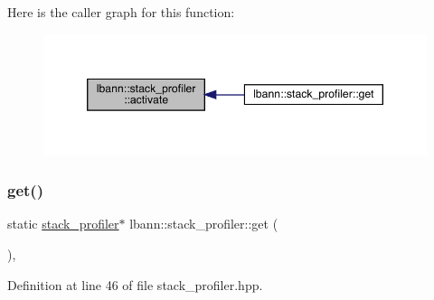 Here is the caller graph for this function\+:\nopagebreak
\begin{figure}[H]
\begin{center}
\leavevmode
\includegraphics[width=346pt]{classlbann_1_1stack__profiler_a5c8e2ec1f36d36ff8211ec8910063777_icgraph}
\end{center}
\end{figure}
\mbox{\label{classlbann_1_1stack__profiler_ab1a7c0531a78ad7e2181a10daee44def}} 
\subsubsection{\texorpdfstring{get()}{get()}}
{\footnotesize\ttfamily static \hyperlink{classlbann_1_1stack__profiler}{stack\+\_\+profiler}$\ast$ lbann\+::stack\+\_\+profiler\+::get (\begin{DoxyParamCaption}{ }\end{DoxyParamCaption})\hspace{0.3cm}{\ttfamily [inline]}, {\ttfamily [static]}}



Definition at line 46 of file stack\+\_\+profiler.\+hpp.


